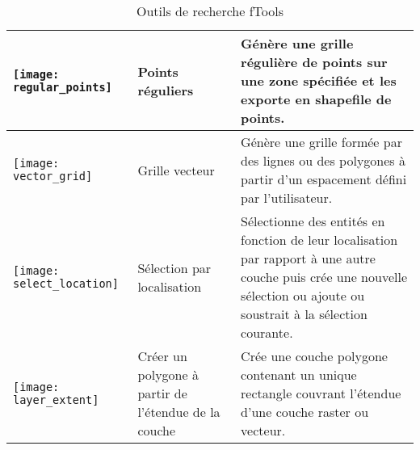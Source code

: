 \begin{table}[ht]
\begin{tabular}{|m{1cm}|m{3cm}|m{9cm}|}
 \hline \texttt{[image: regular\_points]} & Points réguliers & Génère une grille régulière de points sur une zone spécifiée et les exporte en shapefile de points. \\
 \hline \texttt{[image: vector\_grid]} & Grille vecteur & Génère une grille formée par des lignes ou des polygones à partir d'un espacement défini par l'utilisateur. \\
 \hline \texttt{[image: select\_location]} & Sélection par localisation & Sélectionne des entités en fonction de leur localisation par rapport à une autre couche puis crée une nouvelle sélection ou ajoute ou soustrait à la sélection courante. \\
\hline \texttt{[image: layer\_extent]} & Créer un polygone à partir de l'étendue de la couche & Crée une couche polygone contenant un unique rectangle couvrant l'étendue d'une couche raster ou vecteur. \\
 \hline
\end{tabular}
\caption{Outils de recherche fTools}\label{tab:ftool_research}
\end{table}

